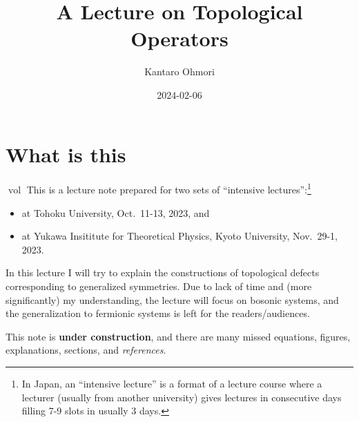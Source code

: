 \documentclass[
  letterpaper,
  DIV=11,
  numbers=noendperiod]{scrreport}
\title{A Lecture on Topological Operators}
\author{Kantaro Ohmori}
\date{2024-02-06}
\providecommand{\tightlist}{%
  \setlength{\itemsep}{0pt}\setlength{\parskip}{0pt}}\usepackage{longtable,booktabs,array}
\DeclareMathOperator{\vol}{vol}
\renewcommand*\contentsname{Table of contents}
\newcommand\contentsname{Table of contents}
\begin{document}
\maketitle

\renewcommand*\contentsname{Table of contents}
{
\hypersetup{linkcolor=}
\setcounter{tocdepth}{2}
\tableofcontents
}

\chapter*{What is this}\label{what-is-this}


\(\vol\) This is a lecture note prepared for two sets of ``intensive
lectures'':\footnote{In Japan, an ``intensive lecture'' is a format of a
  lecture course where a lecturer (usually from another university)
  gives lectures in consecutive days filling 7-9 slots in usually 3
  days.}

\begin{itemize}
\tightlist
\item
  at Tohoku University, Oct.~11-13, 2023, and
\item
  at Yukawa Insititute for Theoretical Physics, Kyoto University,
  Nov.~29-1, 2023.
\end{itemize}

In this lecture I will try to explain the constructions of topological
defects corresponding to generalized symmetries. Due to lack of time and
(more significantly) my understanding, the lecture will focus on bosonic
systems, and the generalization to fermionic systems is left for the
readers/audiences.

\begin{tcolorbox}[enhanced jigsaw, left=2mm, toprule=.15mm, bottomtitle=1mm, titlerule=0mm, leftrule=.75mm, colframe=quarto-callout-warning-color-frame, opacitybacktitle=0.6, title=\textcolor{quarto-callout-warning-color}{\faExclamationTriangle}\hspace{0.5em}{Warning}, bottomrule=.15mm, breakable, arc=.35mm, toptitle=1mm, colbacktitle=quarto-callout-warning-color!10!white, rightrule=.15mm, opacityback=0, coltitle=black, colback=white]

This note is \textbf{under construction}, and there are many missed
equations, figures, explanations, sections, and \emph{references}.

\end{tcolorbox}
\end{document}
